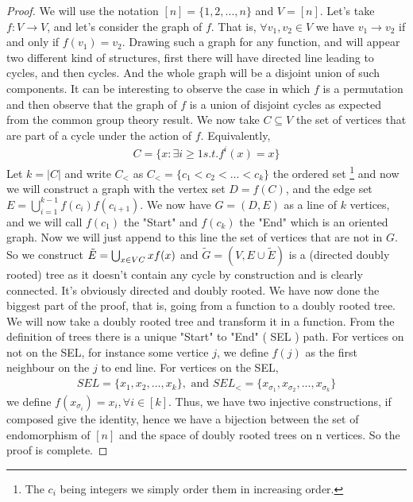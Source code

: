 \begin{proof}
We will use the notation $[n] = \{1, 2, ..., n\}$ and $V = [n]$.
Let's take $f:V \longrightarrow V$, and let's consider the graph of $f$. That is, $\forall v_1, v_2 \in V$ we have $v_1 \rightarrow v_2$ if and only if $f(v_1) = v_2$.
Drawing such a graph for any function, and will appear two different kind of structures, first there will have directed line leading to cycles, and then cycles. 
And the whole graph will be a disjoint union of such components.
It can be interesting to observe the case in which $f$ is a permutation and then observe that the graph of $f$ is a union of disjoint cycles as expected from the common group theory result.
\newline
We now take $C \subseteq V$ the set of vertices that are part of a cycle under the action of $f$. Equivalently,
\begin{align*}
    C = \{ x : \exists i \geq 1 s. t. f^i(x) = x \}
\end{align*}
Let $k = |C|$ and write $C_<$ as $C_< = \{c_1 < c_2 <...<c_k\}$ the ordered set 
\footnote{The $c_i$ being integers we simply order them in increasing order.}
and now we will construct a graph with the vertex set $D = f(C)$, and the edge set $E = \bigcup_{i=1}^{k-1} f(c_i)f(c_{i+1})$. We now have $G=(D, E)$ as a line of $k$ vertices, and we will call $f(c_1)$ the "Start" and $f(c_k)$ the "End" which is an oriented graph.
\newline
Now we will just append to this line the set of vertices that are not in $G$. So we construct $\tilde{E} = \bigcup_{x \in V\\C} x f(x)$ and $\tilde{G} = (V, E\cup\tilde{E})$ is a (directed doubly rooted) tree as it doesn't contain any cycle by construction and is clearly connected. It's obviously directed and  doubly rooted.
We have now done the biggest part of the proof, that is, going from a function to a doubly rooted tree.
\newline
We will now take a doubly rooted tree and transform it in a function. From the definition of trees there is a unique "Start" to "End" ( SEL ) path.
\newline
For vertices on not on the SEL, for instance some vertice $j$, we define $f(j)$ as the first neighbour on the $j$ to end line.
\newline
For vertices on the SEL, 
\begin{align}
    SEL = \{x_1, x_2, ..., x_k\}, \text{ and } SEL_< = \{x_{\sigma_1}, x_{\sigma_2}, ..., x_{\sigma_k}\} 
\end{align}
we define $f(x_{\sigma_i}) = x_i, \forall i \in [k]$.
\newline
Thus, we have two injective constructions, if composed give the identity, hence we have a bijection between the set of endomorphism of $[n]$ and the space of doubly rooted trees on n vertices. So the proof is complete.
\end{proof}
